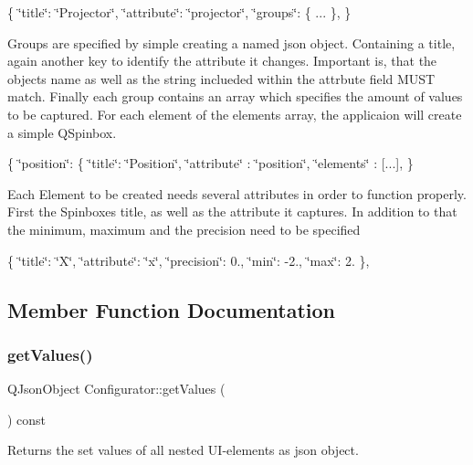 \{ \char`\"{}title\char`\"{}\+: \char`\"{}\+Projector\char`\"{}, \char`\"{}attribute\char`\"{}\+: \char`\"{}projector\char`\"{}, \char`\"{}groups\char`\"{}\+: \{ ... \}, \}

Groups are specified by simple creating a named json object. Containing a title, again another key to identify the attribute it changes. Important is, that the objects name as well as the string inclueded within the \textquotesingle{}attrbute\textquotesingle{} field M\+U\+ST match. Finally each group contains an array which specifies the amount of values to be captured. For each element of the \textquotesingle{}elements\textquotesingle{} array, the applicaion will create a simple Q\+Spinbox.

\{ \char`\"{}position\char`\"{}\+: \{ \char`\"{}title\char`\"{}\+: \char`\"{}\+Position\char`\"{}, \char`\"{}attribute\char`\"{} \+: \char`\"{}position\char`\"{}, \char`\"{}elements\char`\"{} \+: \mbox{[}...\mbox{]}, \}

Each Element to be created needs several attributes in order to function properly. First the Spinboxes title, as well as the attribute it captures. In addition to that the minimum, maximum and the precision need to be specified

\{ \char`\"{}title\char`\"{}\+: \char`\"{}\+X\char`\"{}, \char`\"{}attribute\char`\"{}\+: \char`\"{}x\char`\"{}, \char`\"{}precision\char`\"{}\+: 0., \char`\"{}min\char`\"{}\+: -\/2., \char`\"{}max\char`\"{}\+: 2. \}, 

\subsection{Member Function Documentation}
\mbox{\label{class_configurator_a89fc398da91616473846cfcadd511c81}} 
\subsubsection{\texorpdfstring{get\+Values()}{getValues()}}
{\footnotesize\ttfamily Q\+Json\+Object Configurator\+::get\+Values (\begin{DoxyParamCaption}{ }\end{DoxyParamCaption}) const}



Returns the set values of all nested U\+I-\/elements as json object. 

